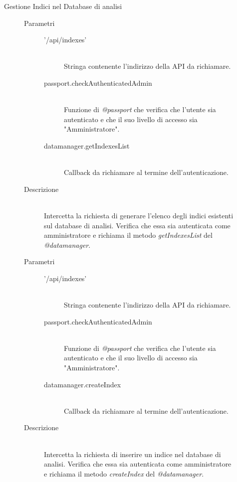 \begin{description}
\begin{description}
\begin{mldescription}
 \end{mldescription}  
 
 \item[Gestione Indici nel Database di analisi]
  \begin{mldescription}
     \hfill 
    \begin{description}
    \item[Parametri] \hfill
     \begin{description}
      \item['/api/indexes'] \hfill \\
      Stringa contenente l'indirizzo della API da richiamare.
      \item[passport.checkAuthenticatedAdmin] \hfill \\
      Funzione di \textit{@passport} che verifica che l'utente sia autenticato e che il suo livello di accesso sia "Amministratore".
      \item[datamanager.getIndexesList] \hfill \\
      Callback da richiamare al termine dell'autenticazione.
     \end{description}
    \item[Descrizione] \hfill \\
    Intercetta la richiesta di generare l'elenco degli indici esistenti sul database di analisi. Verifica che essa sia autenticata come amministratore e richiama il metodo \textit{getIndexesList} del \textit{@datamanager}.
    \end{description}
    
     \hfill 
    \begin{description}
    \item[Parametri] \hfill
     \begin{description}
      \item['/api/indexes'] \hfill \\
      Stringa contenente l'indirizzo della API da richiamare.
      \item[passport.checkAuthenticatedAdmin] \hfill \\
      Funzione di \textit{@passport} che verifica che l'utente sia autenticato e che il suo livello di accesso sia "Amministratore".
      \item[datamanager.createIndex] \hfill \\
      Callback da richiamare al termine dell'autenticazione.
     \end{description}
    \item[Descrizione] \hfill \\
    Intercetta la richiesta di inserire un indice nel database di analisi. Verifica che essa sia autenticata come amministratore e richiama il metodo \textit{createIndex} del \textit{@datamanager}.
    \end{description}
    

\end{mldescription}
\end{description}
\end{description}

